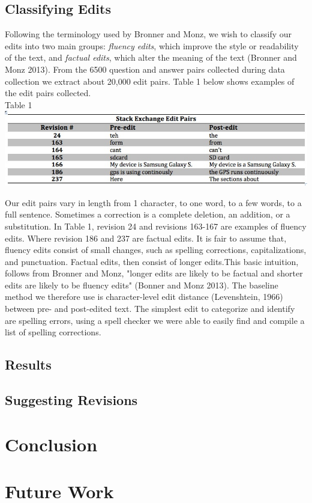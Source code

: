 \documentclass[11pt, oneside]{article}   	%
\begin{document}
\subsection{Classifying Edits} 
Following the terminology used by Bronner and Monz, we wish to classify our edits into two main groups:{ \itshape fluency edits}, which improve the style or readability of the text, and {\itshape factual edits}, which alter the meaning of the text (Bronner and Monz 2013).   From the 6500 question and answer pairs collected during data collection we extract about 20,000 edit pairs.  Table 1 below shows examples of the edit pairs collected. \\

\centering
Table 1
\includegraphics[width=\textwidth]{table1-editpairs}

\raggedright
Our edit pairs vary in length from 1 character, to one word, to a few words, to a full sentence. Sometimes a correction is a complete deletion, an addition, or a substitution. In Table 1, revision 24 and revisions 163-167 are examples of fluency edits. Where revision 186 and 237 are factual edits. It is fair to assume that, fluency edits consist of small changes, such as spelling corrections, capitalizations, and punctuation. Factual edits, then consist of longer edits.This basic intuition, follows from Bronner and Monz, "longer edits are likely
to be factual and shorter edits are likely to be fluency edits" (Bonner and Monz 2013). The baseline method we therefore use is character-level edit distance (Levenshtein, 1966) between pre- and post-edited text. The simplest edit to categorize and identify are spelling errors, using a spell checker we were able to easily find and compile a list of spelling corrections.

\subsection{Results}
\subsection{Suggesting Revisions}

\section{Conclusion}
\section{Future Work}
\end{document}
